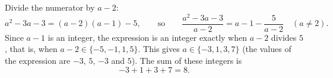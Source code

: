 Divide the numerator by $a-2$:
\[
a^2-3a-3=(a-2)(a-1)-5,\qquad\text{so}\qquad \dfrac{a^2-3a-3}{a-2}=a-1-\dfrac{5}{a-2}\quad(a\ne2).
\]
Since $a-1$ is an integer, the expression is an integer exactly when $a-2$ divides $5$, that is, when $a-2\in\{-5,-1,1,5\}$. This gives $a\in\{-3,1,3,7\}$ (the values of the expression are $-3$, $5$, $-3$ and $5$). The sum of these integers is
\[
-3+1+3+7=\boxed{8}.
\]

